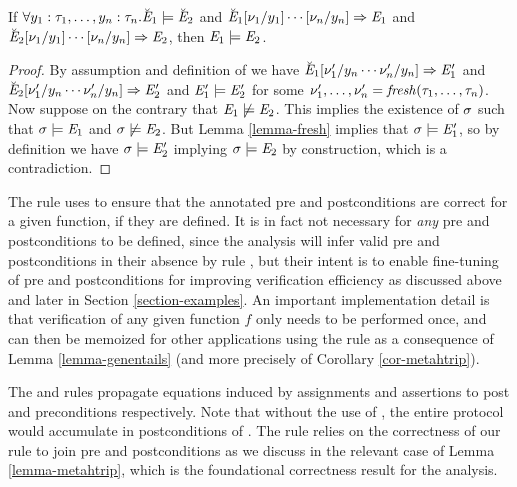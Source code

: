 \begin{lemma}
  \label{lemma-genentails}
  If $\forall y_1:\tau_1,\ldots,y_n:\tau_n . \breve{\mathit{E}}_1 \models \breve{\mathit{E}}_2$ and
  $\breve{\mathit{E}}_1[\nu_1/y_1]\cdots[\nu_n/y_n] \Rightarrow \mathit{E}_1$ and
  $\breve{\mathit{E}}_2[\nu_1/y_1]\cdots[\nu_n/y_n] \Rightarrow \mathit{E}_2$, then
  $\mathit{E}_1 \models \mathit{E}_2$.  
\end{lemma}
\begin{proof}
  By assumption and definition of  we have
  $\breve{\mathit{E}}_1[\nu_1'/y_n \cdots \nu_n'/y_n] \Rightarrow \mathit{E}_1'$ and
  $\breve{\mathit{E}}_2[\nu_1'/y_n \cdots \nu_n'/y_n] \Rightarrow \mathit{E}_2'$ and $\mathit{E}_1'
  \models \mathit{E}_2'$ for some $\nu_1',\ldots,\nu_n' =
  \mathit{fresh}(\tau_1,\ldots,\tau_n)$.  Now suppose on the contrary that
  $\mathit{E}_1 \not\models \mathit{E}_2$.  This implies the existence of $\sigma$
  such that $\sigma \models \mathit{E}_1$ and $\sigma \not\models \mathit{E}_2$.
  But Lemma \ref{lemma-fresh} implies that $\sigma \models \mathit{E}_1'$,
  so by definition we have $\sigma \models \mathit{E}_2'$ implying $\sigma
  \models \mathit{E}_2$ by construction, which is a contradiction.
\end{proof}

\metahtripfig

The  rule uses  to ensure that
the annotated pre and postconditions are correct for a given function,
if they are defined. It is in fact not necessary for \emph{any} pre
and postconditions to be defined, since the analysis will infer valid
pre and postconditions in their absence by rule , but
their intent is to enable fine-tuning of pre and postconditions for
improving verification efficiency as discussed above and later in
Section \ref{section-examples}.  An important implementation detail is
that verification of any given function $f$ only needs to be performed
once, and can then be memoized for other applications using the
 rule as a consequence of Lemma \ref{lemma-genentails}
(and more precisely of Corollary \ref{cor-metahtrip}).

The  and  rules propagate equations
induced by assignments and assertions to post and preconditions
respectively.  Note that without the use of , the
entire protocol would accumulate in postconditions of . The
 rule relies on the correctness of our  rule
to join pre and postconditions as we discuss in the relevant case of
Lemma \ref{lemma-metahtrip}, which is the foundational correctness
result for the analysis.

